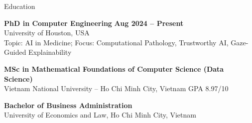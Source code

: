 \documentclass[11pt]{resume}
\begin{document}
\begin{rSection}{Education}

{\bf PhD in Computer Engineering} \hfill {\bf Aug 2024 – Present} \\
University of Houston, USA \\
Topic: AI in Medicine; Focus: Computational Pathology, Trustworthy AI, Gaze-Guided Explainability

{\bf MSc in Mathematical Foundations of Computer Science (Data Science)}  \\ %
Vietnam National University – Ho Chi Minh City, Vietnam \quad GPA 8.97/10

{\bf Bachelor of Business Administration} \\
University of Economics and Law, Ho Chi Minh City, Vietnam
\end{rSection}
\end{document}
